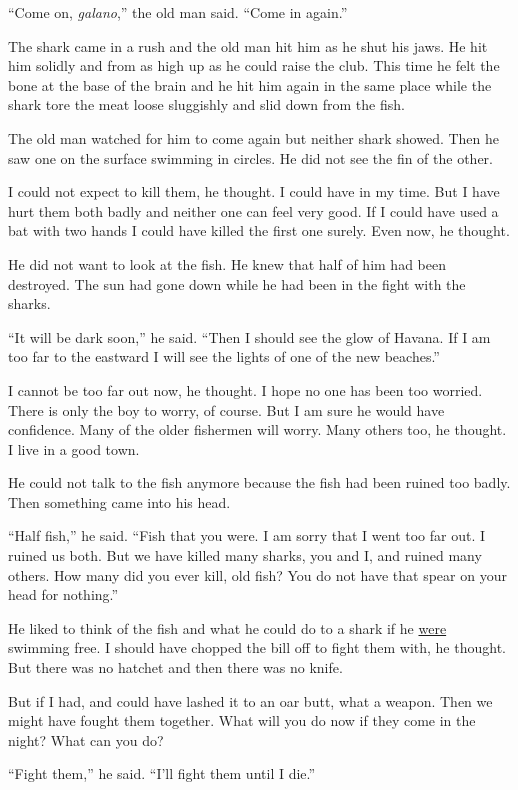 ``Come on, \emph{galano},'' the old man said. ``Come in again.''

The shark came in a rush and the old man hit him as he shut his jaws. He hit
him solidly and from as high up as he could raise the club. This time he
felt the bone at the base of the brain and he hit him again in the same
place while the shark tore the meat loose \gls{sluggishly} and slid down from the
fish.

The old man watched for him to come again but neither shark showed. Then he
saw one on the surface swimming in circles. He did not see the fin of the
other.

I could not expect to kill them, he thought. I could have in my time. But I
have hurt them both badly and neither one can feel very good. If I could
have used a bat with two hands I could have killed the first one surely.
Even now, he thought.

He did not want to look at the fish. He knew that half of him had been
destroyed. The sun had gone down while he had been in the fight with the
sharks.

``It will be dark soon,'' he said. ``Then I should see the glow of Havana.
If I am too far to the eastward I will see the lights of one of the new
beaches.''

I cannot be too far out now, he thought. I hope no one has been too worried.
There is only the boy to worry, of course. But I am sure he would have
\gls{confidence}. Many of the older fishermen will worry. Many others too,
he thought. I live in a good town.

He could not talk to the fish anymore because the fish had been \gls{ruined}
too badly. Then something came into his head.

``Half fish,'' he said. ``Fish that you were. I am sorry that I went too far
out. I ruined us both. But we have killed many sharks, you and I, and ruined
many others. How many did you ever kill, old fish? You do not have that
spear on your head for nothing.''

He liked to think of the fish and what he could do to a shark if he \uline{were}
swimming free. I should have \gls{chopped} the bill off to fight them with,
he thought. But there was no \gls{hatchet} and then there was no knife.

But if I had, and could have lashed it to an oar butt, what a weapon.
Then we might have fought them together. What will you do now if they come
in the night? What can you do?

``Fight them,'' he said. ``I'll fight them until I die.''

